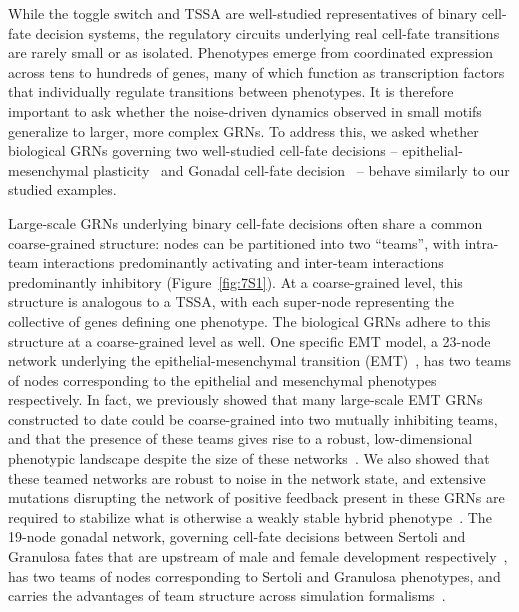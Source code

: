 \documentclass[11pt]{article}
\begin{document}
While the toggle switch and TSSA are well-studied representatives of binary cell-fate decision systems, the regulatory circuits underlying real cell-fate transitions are rarely small or as isolated. Phenotypes emerge from coordinated expression across tens to hundreds of genes, many of which function as transcription factors that individually regulate transitions between phenotypes. It is therefore important to ask whether the noise-driven dynamics observed in small motifs generalize to larger, more complex GRNs. To address this, we asked whether biological GRNs governing two well-studied cell-fate decisions -- epithelial-mesenchymal plasticity~\cite{hari2022landscape} and Gonadal cell-fate decision~\cite{rios2015boolean} -- behave similarly to our studied examples.

Large-scale GRNs underlying binary cell-fate decisions often share a common coarse-grained structure: nodes can be partitioned into two ``teams'', with intra-team interactions predominantly activating and inter-team interactions predominantly inhibitory (Figure~\ref{fig:7S1}). At a coarse-grained level, this structure is analogous to a TSSA, with each super-node representing the collective of genes defining one phenotype. The biological GRNs adhere to this structure at a coarse-grained level as well. One specific EMT model, a 23-node network underlying the epithelial-mesenchymal transition (EMT)~\cite{Huang2017}, has two teams of nodes corresponding to the epithelial and mesenchymal phenotypes respectively. In fact, we previously showed that many large-scale EMT GRNs constructed to date could be coarse-grained into two mutually inhibiting teams, and that the presence of these teams gives rise to a robust, low-dimensional phenotypic landscape despite the size of these networks~\cite{hari2022landscape,tripathi2023minimal,hari2023low}. We also showed that these teamed networks are robust to noise in the network state, and extensive mutations disrupting the network of positive feedback present in these GRNs are required to stabilize what is otherwise a weakly stable hybrid phenotype~\cite{rashid2022network, Hari2025APlasticity}. The 19-node gonadal network, governing cell-fate decisions between Sertoli and Granulosa fates that are upstream of male and female development respectively~\cite{rios2015boolean}, has two teams of nodes corresponding to Sertoli and Granulosa phenotypes, and carries the advantages of team structure across simulation formalisms~\cite{Hari2025LowNetworks, Shyam2025MutuallyNetworks}.
\end{document}

